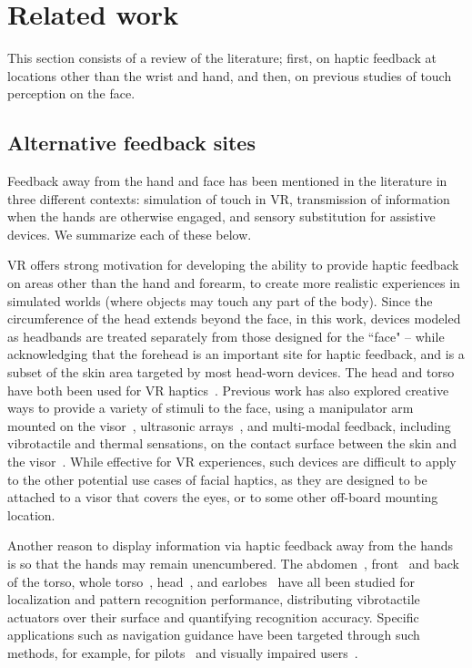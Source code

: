\section{Related work}
This section consists of a review of the literature; first, on haptic feedback at locations other than the wrist and hand, and then, on previous studies of touch perception on the face.
\subsection{Alternative feedback sites}
\label{sc:elsewhere}
Feedback away from the hand and face has been mentioned in the literature in three different contexts: simulation of touch in VR, transmission of information when the hands are otherwise engaged, and sensory substitution for assistive devices. We summarize each of these below.

VR offers strong motivation for developing the ability to provide haptic feedback on areas other than the hand and forearm, to create more realistic experiences in simulated worlds (where objects may touch any part of the body). Since the circumference of the head extends beyond the face, in this work, devices modeled as headbands are treated separately from those designed for the ``face" -- while acknowledging that the forehead is an important site for haptic feedback, and is a subset of the skin area targeted by most head-worn devices. The head and torso have both been used for VR haptics~\cite{adilkhanoc2022review, kaul2016haptichead}. Previous work has also explored creative ways to provide a variety of stimuli to the face, using a manipulator arm mounted on the visor~\cite{wilberz2020}, ultrasonic arrays~\cite{shen2022, lan2024}, and multi-modal feedback, including vibrotactile and thermal sensations, on the contact surface between the skin and the visor~\cite{wolf2019face}. While effective for VR experiences, such devices are difficult to apply to the other potential use cases of facial haptics, as they are designed to be attached to a visor that covers the eyes, or to some other off-board mounting location.

Another reason to display information via haptic feedback away from the hands is so that the hands may remain unencumbered. The abdomen~\cite{cholewiakVibrotactileLocalizationAbdomen2004b}, front~\cite{vanerpAbsoluteLocalizationVibrotactile2008} and back~\cite{jones2008, jones2009} of the torso, whole torso~\cite{kim2023}, head~\cite{gilliland1994}, and earlobes~\cite{lee2019activearring} have all been studied for localization and pattern recognition performance, distributing vibrotactile actuators over their surface and quantifying recognition accuracy. Specific applications such as navigation guidance have been targeted through such methods, for example, for pilots~\cite{cholewiakVibrotactileLocalizationAbdomen2004b} and visually impaired users~\cite{katzschmann2018blind}.


